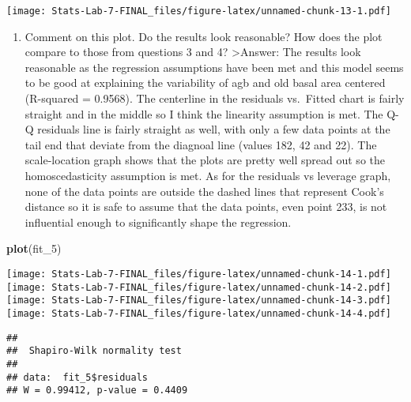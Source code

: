 \documentclass[
]{article}
\newenvironment{Shaded}{\begin{snugshade}}{\end{snugshade}}
\newcommand{\FunctionTok}[1]{\textcolor[rgb]{0.13,0.29,0.53}{\textbf{#1}}}
\newcommand{\NormalTok}[1]{#1}
\newcommand{\SpecialCharTok}[1]{\textcolor[rgb]{0.81,0.36,0.00}{\textbf{#1}}}
\providecommand{\tightlist}{%
  \setlength{\itemsep}{0pt}\setlength{\parskip}{0pt}}
\begin{document}
\texttt{[image: Stats-Lab-7-FINAL\_files/figure-latex/unnamed-chunk-13-1.pdf]}

\begin{enumerate}
\def\labelenumi{\alph{enumi}.}
\setcounter{enumi}{5}
\tightlist
\item
  Comment on this plot. Do the results look reasonable? How does the
  plot compare to those from questions 3 and 4? \textgreater Answer: The
  results look reasonable as the regression assumptions have been met
  and this model seems to be good at explaining the variability of agb
  and old basal area centered (R-squared = 0.9568). The centerline in
  the residuals vs.~Fitted chart is fairly straight and in the middle so
  I think the linearity assumption is met. The Q-Q residuals line is
  fairly straight as well, with only a few data points at the tail end
  that deviate from the diagnoal line (values 182, 42 and 22). The
  scale-location graph shows that the plots are pretty well spread out
  so the homoscedasticity assumption is met. As for the residuals vs
  leverage graph, none of the data points are outside the dashed lines
  that represent Cook's distance so it is safe to assume that the data
  points, even point 233, is not influential enough to significantly
  shape the regression.
\end{enumerate}

\begin{Shaded}
\begin{Highlighting}[]
\FunctionTok{plot}\NormalTok{(fit\_5)}
\end{Highlighting}
\end{Shaded}

\texttt{[image: Stats-Lab-7-FINAL\_files/figure-latex/unnamed-chunk-14-1.pdf]}
\texttt{[image: Stats-Lab-7-FINAL\_files/figure-latex/unnamed-chunk-14-2.pdf]}
\texttt{[image: Stats-Lab-7-FINAL\_files/figure-latex/unnamed-chunk-14-3.pdf]}
\texttt{[image: Stats-Lab-7-FINAL\_files/figure-latex/unnamed-chunk-14-4.pdf]}

\begin{Shaded}
\end{Shaded}

\begin{verbatim}
## 
##  Shapiro-Wilk normality test
## 
## data:  fit_5$residuals
## W = 0.99412, p-value = 0.4409
\end{verbatim}
\end{document}
